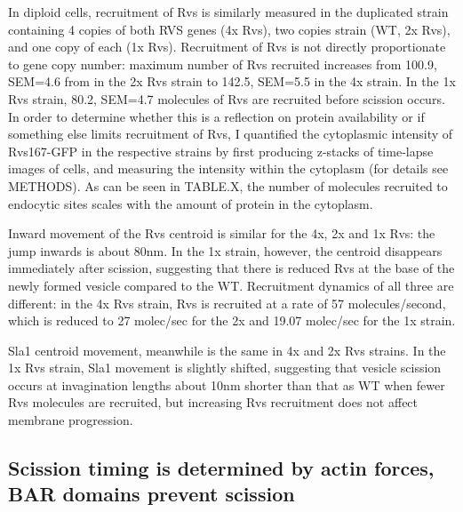 	
	In diploid cells, recruitment of Rvs is similarly measured in the duplicated strain containing 4 copies of both RVS genes (4x Rvs), two copies strain (WT, 2x Rvs), and one copy of each (1x Rvs). Recruitment of Rvs is not directly proportionate to gene copy number: maximum number of Rvs recruited increases from 100.9, SEM=4.6 from in the 2x Rvs strain to 142.5, SEM=5.5 in the 4x strain. In the 1x Rvs strain, 80.2, SEM=4.7 molecules of Rvs are recruited before scission occurs. In order to determine whether this is a reflection on protein availability or if something else limits recruitment of Rvs, I quantified the cytoplasmic intensity of Rvs167-GFP in the respective strains by first producing z-stacks of time-lapse images of cells, and measuring the intensity within the cytoplasm (for details see METHODS). As can be seen in TABLE.X, the number of molecules recruited to endocytic sites scales with the amount of protein in the cytoplasm.  
	\vspace{5mm}
	
	Inward movement of the Rvs centroid is similar for the 4x, 2x and 1x Rvs: the jump inwards is about 80nm. In the 1x strain, however, the centroid disappears immediately after scission, suggesting that there is reduced Rvs at the base of the newly formed vesicle compared to the WT. Recruitment dynamics of all three are different: in the 4x Rvs strain, Rvs is recruited at a rate of 57 molecules/second, which is reduced to 27 molec/sec for the 2x and 19.07 molec/sec for the 1x strain. 

	\vspace{5mm}
	 Sla1 centroid movement, meanwhile is the same in 4x and 2x Rvs strains. In the 1x Rvs strain, Sla1 movement is slightly shifted, suggesting that vesicle scission occurs at invagination lengths about 10nm shorter than that as WT when fewer Rvs molecules are recruited, but increasing Rvs recruitment does not affect membrane progression. 


	
	\subsection{Scission timing is determined by actin forces, \\
		BAR domains prevent scission}
	
